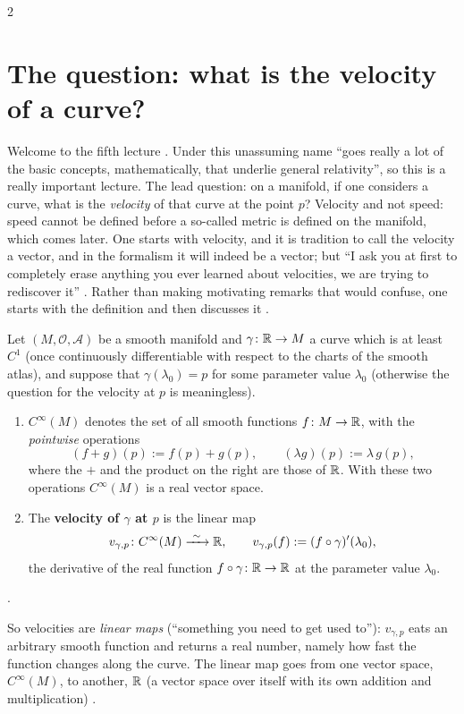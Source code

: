 \begin{paracol}{2}
\section{The question: what is the velocity of a curve?}\label{sec:c05-velocity}

Welcome to the fifth lecture . Under this unassuming name ``goes really a lot of the basic concepts, mathematically, that underlie general relativity'', so this is a really important lecture. The lead question: on a manifold, if one considers a curve, what is the \emph{velocity} of that curve at the point $p$?
Velocity and not speed: speed cannot be defined before a so-called metric is defined on the manifold, which comes later. One starts with velocity, and it is tradition to call the velocity a vector, and in the formalism it will indeed be a vector; but ``I ask you at first to completely erase anything you ever learned about velocities, we are trying to rediscover it''
. Rather than making motivating remarks that would confuse, one starts with the definition and then discusses it .

\begin{definition}\label{def:c05-velocity}
Let $(M,\mathcal O,\mathcal A)$ be a smooth manifold and $\gamma\colon\mathbb{R}\to M$ a curve which is at least $C^1$ (once continuously differentiable with respect to the charts of the smooth atlas), and suppose that $\gamma(\lambda_0)=p$ for some parameter value $\lambda_0$ (otherwise the question for the velocity at $p$ is meaningless).
\begin{enumerate}
  \item $C^\infty(M)$ denotes the set of all smooth functions $f\colon M\to\mathbb{R}$, with the \emph{pointwise} operations
        \[
          (f+g)(p):=f(p)+g(p),\qquad(\lambda g)(p):=\lambda\,g(p),
        \]
        where the $+$ and the product on the right are those of $\mathbb{R}$. With these two operations $C^\infty(M)$ is a real vector space.
  \item The \textbf{velocity of $\gamma$ at $p$} is the linear map
        \[
          v_{\gamma,p}\colon C^\infty(M)\xrightarrow{\ \sim\ }\mathbb{R},\qquad v_{\gamma,p}(f):=(f\circ\gamma)'(\lambda_0),
        \]
        the derivative of the real function $f\circ\gamma\colon\mathbb{R}\to\mathbb{R}$ at the parameter value $\lambda_0$.
\end{enumerate}
.
\end{definition}
So velocities are \emph{linear maps} (``something you need to get used to''): $v_{\gamma,p}$ eats an arbitrary smooth function and returns a real number, namely how fast the function changes along the curve. The linear map goes from one vector space, $C^\infty(M)$, to another, $\mathbb{R}$ (a vector space over itself with its own addition and multiplication)
.


\end{paracol}
